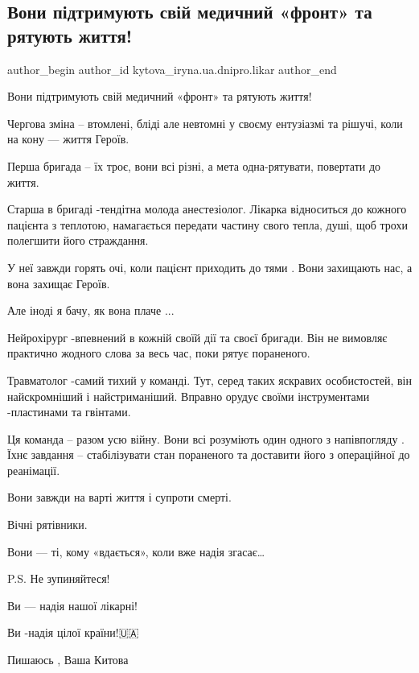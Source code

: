  
 
 
 
 

\subsection{Вони підтримують свій медичний «фронт» та рятують життя!}
\label{sec:12_01_2023.fb.kytova_iryna.ua.dnipro.likar.1.voni_p_dtrimuyut_sv_}

\ifcmt
 author_begin
   author_id kytova_iryna.ua.dnipro.likar
 author_end
\fi

Вони підтримують свій медичний «фронт» та рятують життя!

Чергова зміна – втомлені, бліді але невтомні у своєму ентузіазмі та рішучі,
коли на кону — життя Героїв.

Перша бригада – їх троє, вони всі різні, а мета одна-рятувати, повертати до
життя.

Старша  в бригаді -тендітна молода анестезіолог. Лікарка відноситься до кожного
пацієнта з теплотою, намагається передати частину свого тепла, душі, щоб трохи
полегшити його страждання.

У неї завжди  горять очі, коли пацієнт  приходить до тями . Вони захищають нас,
а вона захищає Героїв. 

Але іноді я бачу, як вона плаче ... 

Нейрохірург  -впевнений в кожній своїй дії та своєї бригади. Він не вимовляє
практично жодного слова за весь час, поки рятує пораненого.

Травматолог  -самий тихий у команді. Тут, серед таких яскравих особистостей,
він найскромніший і найстриманіший. Вправно орудує своїми інструментами
-пластинами та гвінтами.

Ця команда – разом усю війну. Вони всі розуміють один одного з напівпогляду .
Їхнє завдання – стабілізувати стан пораненого та доставити його з операційної
до реанімації.

Вони завжди на варті життя і супроти смерті. 

Вічні рятівники. 

Вони — ті, кому  «вдається», коли вже  надія згасає…

P.S. Не зупиняйтеся! 

Ви — надія нашої лікарні!      

Ви -надія цілої країни!🇺🇦

Пишаюсь , Ваша Китова 💙💛
